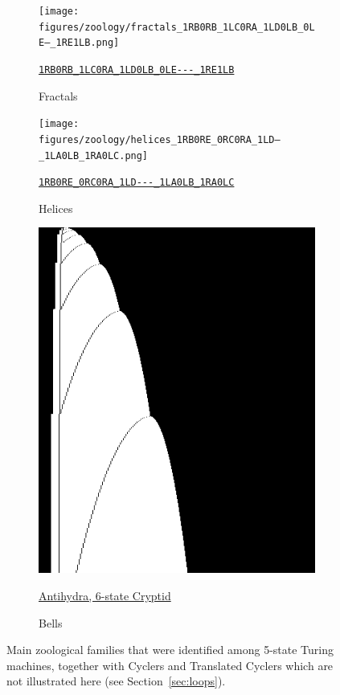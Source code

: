 \documentclass[a4paper,british]{article}
\theoremstyle{definition} %
\numberwithin{equation}{section}
\theoremstyle{definition} %
\newcommand{\tm}[1]{\href{https://bbchallenge.org/#1}{\texttt{\nolinkurl{#1}}}}
\begin{document}
\begin{figure}[htbp]
    \begin{subfigure}{0.3\textwidth}
        \centering
        \texttt{[image: figures/zoology/fractals\_1RB0RB\_1LC0RA\_1LD0LB\_0LE---\_1RE1LB.png]}
        \caption*{Fractals}
        {\scriptsize \tm{1RB0RB_1LC0RA_1LD0LB_0LE---_1RE1LB}}
    \end{subfigure}
    \hfill
    \begin{subfigure}{0.3\textwidth}
        \centering
        \texttt{[image: figures/zoology/helices\_1RB0RE\_0RC0RA\_1LD---\_1LA0LB\_1RA0LC.png]}
        \caption*{Helices}
        {\scriptsize \tm{1RB0RE_0RC0RA_1LD---_1LA0LB_1RA0LC}}
    \end{subfigure}
    \hfill
    \begin{subfigure}{0.3\textwidth}
        \centering
        \includegraphics[width=\linewidth]{figures/zoology/bell_antihydra.png}
        \caption*{Bells}
        {\scriptsize \href{https://bbchallenge.org/antihydra}{Antihydra, 6-state Cryptid}}
    \end{subfigure}

    \caption{Main zoological families that were identified among 5-state Turing machines, together with Cyclers and Translated Cyclers which are not illustrated here (see Section~\ref{sec:loops}). }
    \label{fig:zoology}
\end{figure}
\end{document}
